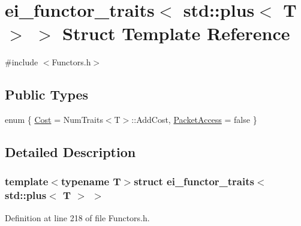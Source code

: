 \hypertarget{structei__functor__traits_3_01std_1_1plus_3_01_t_01_4_01_4}{\section{ei\-\_\-functor\-\_\-traits$<$ std\-:\-:plus$<$ T $>$ $>$ Struct Template Reference}
\label{structei__functor__traits_3_01std_1_1plus_3_01_t_01_4_01_4}
}


{\ttfamily \#include $<$Functors.\-h$>$}

\subsection*{Public Types}
\begin{DoxyCompactItemize}
\item 
enum \{ \hyperlink{structei__functor__traits_3_01std_1_1plus_3_01_t_01_4_01_4_a9a15423a82619503488f5c34ee301ca6aa42e35c8e233374cc23b8823628b2560}{Cost} = Num\-Traits$<$T$>$\-:\-:Add\-Cost, 
\hyperlink{structei__functor__traits_3_01std_1_1plus_3_01_t_01_4_01_4_a9a15423a82619503488f5c34ee301ca6a5c0c61fd6457de72c1fd2b722ddd8954}{Packet\-Access} = false
 \}
\end{DoxyCompactItemize}


\subsection{Detailed Description}
\subsubsection*{template$<$typename T$>$struct ei\-\_\-functor\-\_\-traits$<$ std\-::plus$<$ T $>$ $>$}



Definition at line 218 of file Functors.\-h.



